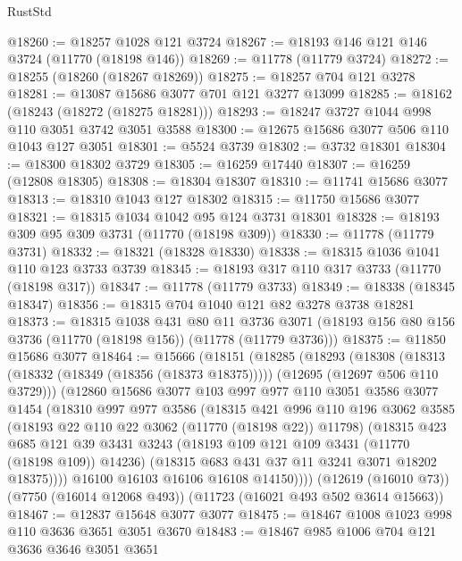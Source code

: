 \begin{lexlean}{RustStd}
\begin{coremodule}
@18260 := @18257 @1028 @121 @3724
@18267 := @18193 @146 @121 @146 @3724 (@11770 (@18198 @146))
@18269 := @11778 (@11779 @3724)
@18272 := @18255 (@18260 (@18267 @18269))
@18275 := @18257 @704 @121 @3278
@18281 := @13087 @15686 @3077 @701 @121 @3277 @13099
@18285 := @18162 (@18243 (@18272 (@18275 @18281)))
@18293 := @18247 @3727 @1044 @998 @110 @3051 @3742 @3051 @3588
@18300 := @12675 @15686 @3077 @506 @110 @1043 @127 @3051
@18301 := @5524 @3739
@18302 := @3732 @18301
@18304 := @18300 @18302 @3729
@18305 := @16259 @17440
@18307 := @16259 (@12808 @18305)
@18308 := @18304 @18307
@18310 := @11741 @15686 @3077
@18313 := @18310 @1043 @127 @18302
@18315 := @11750 @15686 @3077
@18321 := @18315 @1034 @1042 @95 @124 @3731 @18301
@18328 := @18193 @309 @95 @309 @3731 (@11770 (@18198 @309))
@18330 := @11778 (@11779 @3731)
@18332 := @18321 (@18328 @18330)
@18338 := @18315 @1036 @1041 @110 @123 @3733 @3739
@18345 := @18193 @317 @110 @317 @3733 (@11770 (@18198 @317))
@18347 := @11778 (@11779 @3733)
@18349 := @18338 (@18345 @18347)
@18356 := @18315 @704 @1040 @121 @82 @3278 @3738 @18281
@18373 := @18315
    @1038
    @431
    @80
    @11
    @3736
    @3071
    (@18193 @156 @80 @156 @3736 (@11770 (@18198 @156)) (@11778 (@11779 @3736)))
@18375 := @11850 @15686 @3077
@18464 := @15666
    (@18151
      (@18285
        (@18293
          (@18308
            (@18313 (@18332 (@18349 (@18356 (@18373 @18375)))))
            (@12695 (@12697 @506 @110 @3729)))
          (@12860
            @15686
            @3077
            @103
            @997
            @977
            @110
            @3051
            @3586
            @3077
            @1454
            (@18310
              @997
              @977
              @3586
              (@18315
                @421
                @996
                @110
                @196
                @3062
                @3585
                (@18193 @22 @110 @22 @3062 (@11770 (@18198 @22)) @11798)
                (@18315
                  @423
                  @685
                  @121
                  @39
                  @3431
                  @3243
                  (@18193 @109 @121 @109 @3431 (@11770 (@18198 @109)) @14236)
                  (@18315 @683 @431 @37 @11 @3241 @3071 @18202 @18375))))
            @16100
            @16103
            @16106
            @16108
            @14150))))
    (@12619 (@16010 @73))
    (@7750 (@16014 @12068 @493))
    (@11723 (@16021 @493 @502 @3614 @15663))
@18467 := @12837 @15648 @3077 @3077
@18475 := @18467 @1008 @1023 @998 @110 @3636 @3651 @3051 @3670
@18483 := @18467 @985 @1006 @704 @121 @3636 @3646 @3051 @3651

\end{coremodule}
\end{lexlean}
